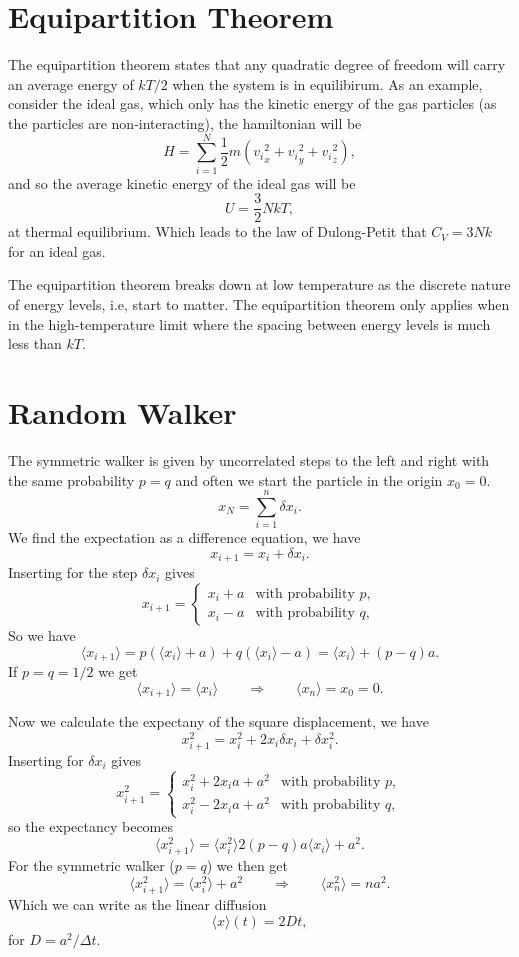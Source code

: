 \documentclass[a4paper, 11pt, notitlepage, english]{article}
\newcommand{\To}{\quad\Rightarrow\quad}
\begin{document}
\section*{Equipartition Theorem}

The equipartition theorem states that any quadratic degree of freedom will carry an average energy of $kT/2$ when the system is in equilibirum. As an example, consider the ideal gas, which only has the kinetic energy of the gas particles (as the particles are non-interacting), the hamiltonian will be
$$H = \sum_{i=1}^N \frac{1}{2}m({v_i}_x^2+{v_i}_y^2+{v_i}_z^2),$$
and so the average kinetic energy of the ideal gas will be
$$U = \frac{3}{2}NkT,$$
at thermal equilibrium. Which leads to the law of Dulong-Petit that $C_V = 3Nk$ for an ideal gas.

The equipartition theorem breaks down at low temperature as the discrete nature of energy levels, i.e, start to matter. The equipartition theorem only applies when in the high-temperature limit where the spacing between energy levels is much less than $kT$.


\section*{Random Walker}

The symmetric walker is given by uncorrelated steps to the left and right with the same probability $p=q$ and often we start the particle in the origin $x_0 = 0$.
$$x_N = \sum_{i=1}^n \delta x_i.$$
We find the expectation as a difference equation, we have
$$x_{i+1} = x_{i} + \delta x_i.$$
Inserting for the step $\delta x_i$ gives
$$x_{i+1} = \begin{cases}
	x_i + a & \mbox{with probability } p, \\
	x_i - a & \mbox{with probability } q,
\end{cases}$$
So we have
$$\langle x_{i+1} \rangle = p(\langle x_i \rangle + a) + q(\langle x_i \rangle - a) = \langle x_i \rangle + (p-q)a.$$
If $p=q=1/2$ we get
$$\langle x_{i+1} \rangle = \langle x_i \rangle \quad \To \quad \langle x_n \rangle = x_0 = 0.$$

Now we calculate the expectany of the square displacement, we have
$$x_{i+1}^2 = x_{i}^2 + 2x_i\delta x_i + \delta x_i^2.$$
Inserting for $\delta x_i$ gives
$$x_{i+1}^2 = \begin{cases}
	x_i^2 + 2x_ia + a^2 & \mbox{with probability } p, \\
	x_i^2 - 2x_ia + a^2 & \mbox{with probability } q,
\end{cases}$$
so the expectancy becomes
$$\langle x_{i+1}^2 \rangle = \langle x_i^2 \rangle 2(p-q)a \langle x_i \rangle + a^2.$$
For the symmetric walker ($p=q$) we then get
$$\langle x_{i+1}^2 \rangle = \langle x_i^2 \rangle + a^2 \quad \To \quad \langle x_n^2 \rangle = na^2.$$
Which we can write as the linear diffusion
$$\langle x \rangle(t) = 2Dt,$$
for $D = a^2/\Delta t$.
\end{document}
